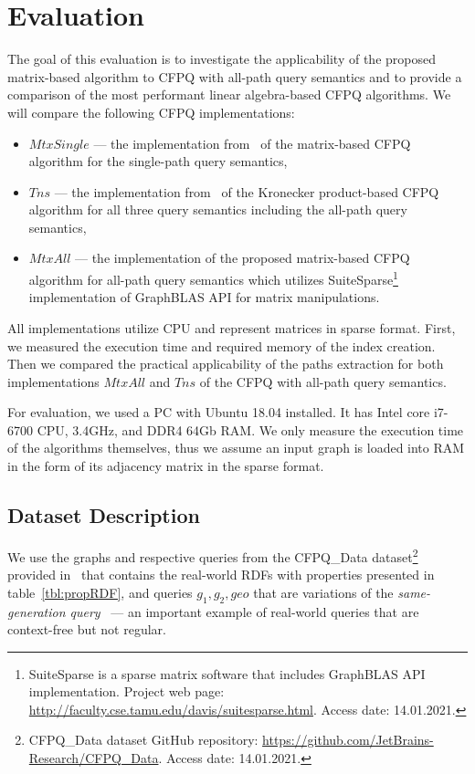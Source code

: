 \section{Evaluation}
The goal of this evaluation is to investigate the applicability of the proposed matrix-based algorithm to CFPQ with all-path query semantics and to provide a comparison of the most performant linear algebra-based CFPQ algorithms. We will compare the following CFPQ implementations:
\begin{itemize}
	\item $MtxSingle$ --- the implementation from~\cite{10.1145/3398682.3399163} of the matrix-based CFPQ algorithm for the single-path query semantics,
	\item $Tns$ --- the implementation from~\cite{kron} of the Kronecker product-based CFPQ algorithm for all three query semantics including the all-path query semantics,
	\item $MtxAll$ --- the implementation of the proposed matrix-based CFPQ algorithm for all-path query semantics which utilizes SuiteSparse\footnote{SuiteSparse is a sparse matrix software that includes GraphBLAS API implementation. Project web page: \url{http://faculty.cse.tamu.edu/davis/suitesparse.html}. Access date: 14.01.2021.}~\cite{Davis2018Algorithm9S} implementation of GraphBLAS API for matrix manipulations.
\end{itemize}

All implementations utilize CPU and represent matrices in sparse format. First, we measured the execution time and required memory of the index creation. Then we compared the practical applicability of the paths extraction for both implementations $MtxAll$ and $Tns$ of the CFPQ with all-path query semantics.

For evaluation, we used a PC with Ubuntu 18.04 installed.
It has Intel core i7-6700 CPU, 3.4GHz, and DDR4 64Gb RAM.
We only measure the execution time of the algorithms themselves, thus we assume an input graph is loaded into RAM in the form of its adjacency matrix in the sparse format.

\subsection{Dataset Description}

We use the graphs and respective queries from the CFPQ\_Data dataset\footnote{CFPQ\_Data dataset GitHub repository: \url{https://github.com/JetBrains-Research/CFPQ_Data}. Access date: 14.01.2021.} provided in~\cite{10.1145/3398682.3399163} that contains the real-world RDFs with properties presented in table~\ref{tbl:propRDF}, and queries $g_1, g_2, geo$ 
that are variations of the \textit{same-generation query}~\cite{FndDB} --- an important example of real-world queries that are context-free but not regular.




